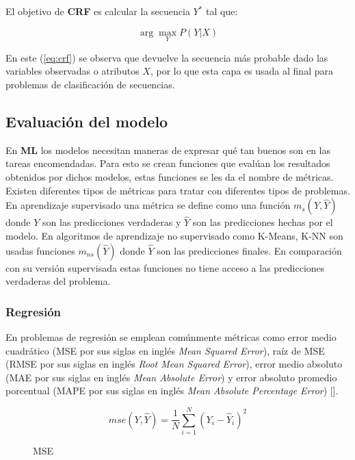 El objetivo de \textbf{CRF} es calcular la secuencia $Y^*$ tal que:

\begin{equation}
	\arg \max_Y P(Y | X)
\end{equation}\label{eq:crf}

En este (\ref{eq:crf}) se observa que devuelve la secuencia más probable dado las variables observadas o atributos $X$,
por lo que esta capa es usada al final para problemas de clasificación de secuencias.

\subsection{Evaluación del modelo}

En \textbf{ML} los modelos necesitan maneras de expresar qué tan buenos son 
en las tareas encomendadas. Para esto se crean funciones que evalúan los resultados obtenidos
por dichos modelos, estas funciones se les da el nombre de métricas. Existen diferentes tipos de
métricas para tratar con diferentes tipos de problemas. En aprendizaje supervisado una métrica se
define como una función $m_s(Y, \hat{Y})$ donde $Y$ son las predicciones verdaderas y $\hat{Y}$ son las predicciones
hechas por el modelo. En algoritmos de aprendizaje no supervisado como K-Means, K-NN son usadas funciones $m_{ns}(\hat{Y})$
donde $\hat{Y}$ son las predicciones finales. En comparación con su versión supervisada estas funciones no tiene acceso
a las predicciones verdaderas del problema.

\subsubsection{Regresión}

En problemas de regresión se emplean comúnmente
métricas como error medio cuadrático (MSE por sus siglas en inglés \emph{Mean Squared Error}), 
raíz de MSE (RMSE por sus siglas en inglés \emph{Root Mean Squared Error}),
error medio absoluto (MAE por sus siglas en inglés \emph{Mean Absolute Error}) y error absoluto promedio porcentual 
(MAPE por sus siglas en inglés \emph{Mean Absolute Percentage Error}) [\cite{botchkarev2019new}].

\begin{figure}
	\begin{equation}\label{metric:MSE}
		mse(Y, \hat{Y}) = \frac{1}{N} \sum^{N}_{i=1} (Y_i - \hat{Y}_i)^2
	\end{equation}
	\caption{MSE}
\end{figure}

